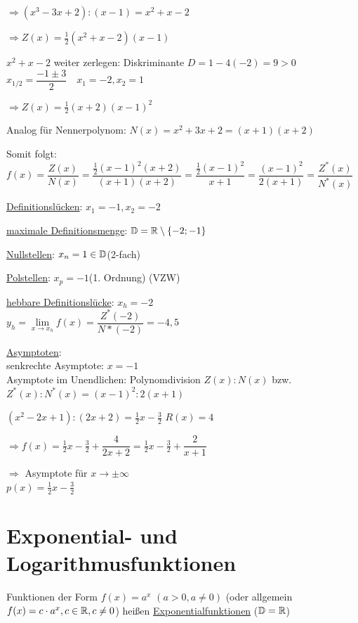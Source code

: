 \begin{itemize}
	$\Rightarrow(x^3-3x+2):(x-1)=x^2+x-2$
	
	$\Rightarrow Z(x)=\frac{1}{2}(x^2+x-2)(x-1)$
	
	$x^2+x-2$ weiter zerlegen: Diskriminante $D=1-4(-2)=9>0$\\
	$x_{1/2}=\dfrac{-1\pm3}{2}\quad x_1=-2, x_2=1$
	
	$\Rightarrow Z(x)=\frac{1}{2}(x+2)(x-1)^2$
	
	Analog für Nennerpolynom: $N(x)=x^2+3x+2=(x+1)(x+2)$
	
	Somit folgt:\\
	$f(x)=\dfrac{Z(x)}{N(x)}=\dfrac{\frac{1}{2}(x-1)^2(x+2)}{(x+1)(x+2)} =\dfrac{\frac{1}{2}(x-1)^2}{x+1}= \dfrac{(x-1)^2}{2(x+1)}=\dfrac{Z^*(x)}{N^*(x)}$
	
	\ul{Definitionslücken}: $x_1=-1, x_2=-2$
	
	\ul{maximale Definitionsmenge}: $\mathbb{D}=\mathbb{R}\setminus\{-2;-1\}$
	
	\ul{Nullstellen}: $x_n=1\in\mathbb{D}$\quad(2-fach)
	
	\ul{Polstellen}: $x_p=-1$\quad(1. Ordnung) (VZW)
	
	\ul{hebbare Definitionslücke}: $x_h=-2$\\
	$y_h=\lim\limits_{x\to x_h}f(x)=\dfrac{Z^*(-2)}{N*(-2)}=-4{,}5$
	
	\ul{Asymptoten}:\\
	senkrechte Asymptote: $x=-1$\\
	Asymptote im Unendlichen: Polynomdivision $Z(x):N(x)$ bzw. $Z^*(x):N^*(x)=(x-1)^2:2(x+1)$
	
	$(x^2-2x+1):(2x+2)=\frac{1}{2}x-\frac{3}{2}$ $R(x)=4$
	
	$\Rightarrow f(x)=\frac{1}{2}x-\frac{3}{2}+\dfrac{4}{2x+2}=\frac{1}{2}x-\frac{3}{2}+\dfrac{2}{x+1}$
	
	$\Rightarrow$ Asymptote für $x\to\pm\infty$\\
	$p(x)=\frac{1}{2}x-\frac{3}{2}$
	
\end{itemize}

\clearpage
\section{Exponential- und Logarithmusfunktionen}
\Def Funktionen der Form $f(x)=a^x$ $(a>0,a\ne0)$ (oder allgemein $f(x)=c\cdot a^x,c\in\mathbb{R},c\ne0$) heißen \ul{Exponentialfunktionen} ($\mathbb{D}=\mathbb{R}$)

